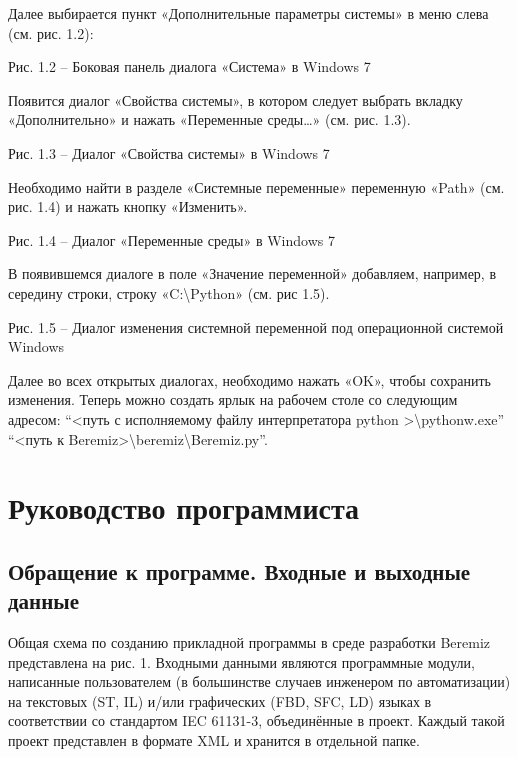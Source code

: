 \documentclass[letterpaper,10pt,russian]{sphinxmanual}
\begin{document}
Далее выбирается пункт «Дополнительные параметры системы» в меню слева
(см. рис. 1.2):


Рис. 1.2 – Боковая панель диалога «Система» в Windows 7

Появится диалог «Свойства системы», в котором следует выбрать вкладку
«Дополнительно» и нажать «Переменные среды…» (см. рис. 1.3).


Рис. 1.3 – Диалог «Свойства системы» в Windows 7

Необходимо найти в разделе «Системные переменные» переменную «Path» (см.
рис. 1.4) и нажать кнопку «Изменить».


Рис. 1.4 – Диалог «Переменные среды» в Windows 7

В появившемся диалоге в поле «Значение переменной» добавляем, например,
в середину строки, строку «C:\textbackslash{}Python» (см. рис 1.5).


Рис. 1.5 – Диалог изменения системной переменной под операционной
системой Windows

Далее во всех открытых диалогах, необходимо нажать «OK», чтобы сохранить
изменения. Теперь можно создать ярлык на рабочем столе со следующим
адресом: ``\textless{}путь с исполняемому файлу интерпретатора python
\textgreater{}\textbackslash{}pythonw.exe'' ``\textless{}путь к Beremiz\textgreater{}\textbackslash{}beremiz\textbackslash{}Beremiz.py''.


\section{Руководство программиста}
\label{usage_guide/index::doc}\label{usage_guide/index:id1}

\subsection{Обращение к программе. Входные и выходные данные}
\label{usage_guide/overview::doc}\label{usage_guide/overview:id1}
Общая схема по созданию прикладной программы в среде разработки Beremiz
представлена на рис. 1. Входными данными являются программные модули,
написанные пользователем (в большинстве случаев инженером по
автоматизации) на текстовых (ST, IL) и/или графических (FBD, SFC, LD)
языках в соответствии со стандартом IEC 61131-3, объединённые в проект.
Каждый такой проект представлен в формате XML и хранится в отдельной
папке.
\end{document}
